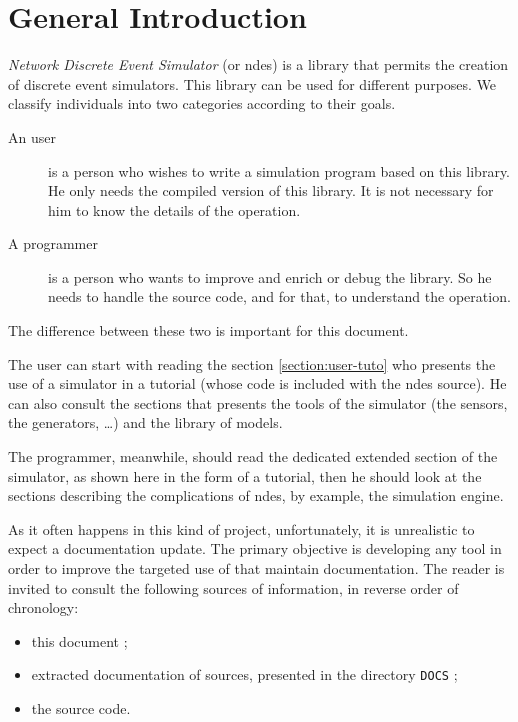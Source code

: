 %
\section{General Introduction}

   {\em Network Discrete Event Simulator} (or {\sc ndes}) is a library
that permits the creation of discrete event simulators. This library can be used for different purposes. We classify individuals into two categories according to
their goals.

\begin{description}
   \item[An user] is a person who wishes to write a
      simulation program based on this library. He only needs
      the compiled version of this library. It is not
      necessary for him to know the details of the operation.

   \item[A programmer] is a person who wants to improve and enrich
      or debug the library. So he needs to handle the
      source code, and for that, to understand the operation.
\end{description}

   The difference between these two is important for this document.

   The user can start with reading the section
\ref{section:user-tuto} who presents the use of a simulator in a tutorial 
(whose code is included with the {\sc ndes} source). He can also consult the sections that presents the tools of the simulator (the sensors, the generators, \ldots) and the library of models.

   The programmer, meanwhile, should read the dedicated extended section of the simulator, as shown here in the form of a tutorial, then he should look at the sections describing the complications of {\sc ndes}, by example, the simulation engine.

   
   As it often happens in this kind of project, unfortunately, it is
unrealistic to expect a documentation update. The primary objective is
developing any tool in order to improve the targeted use of that
maintain documentation. The reader is invited to consult
the following sources of information, in reverse order of chronology:


\begin{itemize}
   \item this document ;
   \item extracted documentation of sources, presented
      in the directory {\tt DOCS} ;
   \item the source code.
\end{itemize}

